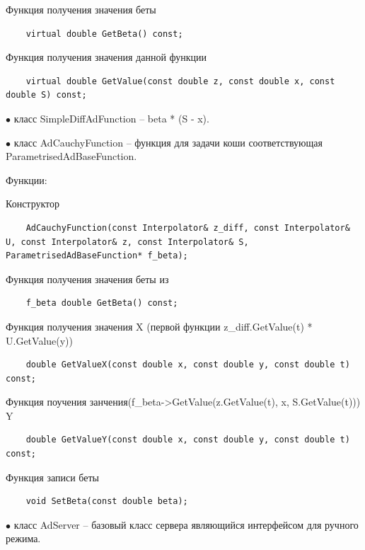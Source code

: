 \documentclass{article}
\theoremstyle{definition}
\theoremstyle{remark}
\begin{document}
Функция получения значения беты

\begin{lstlisting}
	virtual double GetBeta() const;

\end{lstlisting}

Функция получения значения данной функции

\begin{lstlisting}
	virtual double GetValue(const double z, const double x, const double S) const;

\end{lstlisting}

$\bullet$ класс SimpleDiffAdFunction -- beta * (S - x).


$\bullet$ класс AdCauchyFunction -- функция для задачи коши соответствующая ParametrisedAdBaseFunction.

Функции:

Конструктор

\begin{lstlisting}
	AdCauchyFunction(const Interpolator& z_diff, const Interpolator& U, const Interpolator& z, const Interpolator& S, ParametrisedAdBaseFunction* f_beta);
\end{lstlisting}

Функция получения значения беты из

\begin{lstlisting}
	f_beta double GetBeta() const;
\end{lstlisting}

Функция получения значения X (первой функции z\_diff.GetValue(t) * U.GetValue(y))

\begin{lstlisting}
	double GetValueX(const double x, const double y, const double t) const;
\end{lstlisting}

Функция поучения занчения(f\_beta->GetValue(z.GetValue(t), x, S.GetValue(t))) Y

\begin{lstlisting}
	double GetValueY(const double x, const double y, const double t) const;
\end{lstlisting}

Функция записи беты

\begin{lstlisting}
	void SetBeta(const double beta);
\end{lstlisting}

$\bullet$ класс AdServer -- базовый класс сервера являющийся интерфейсом для ручного режима.
\end{document}
